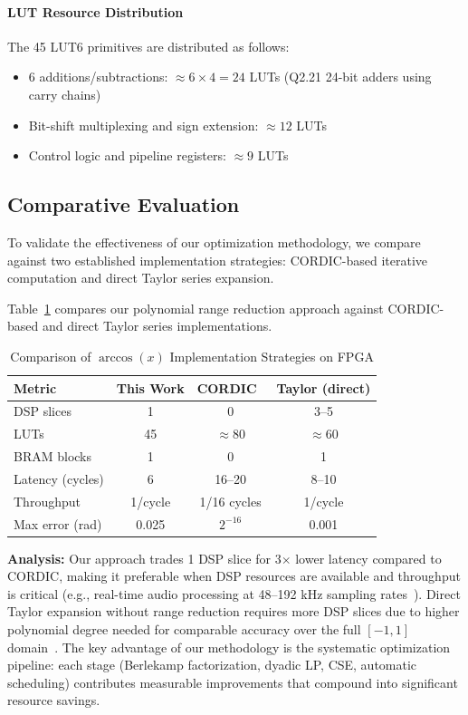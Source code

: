 \paragraph{LUT Resource Distribution}
The 45 LUT6 primitives are distributed as follows:
\begin{itemize}
    \item 6 additions/subtractions: $\approx 6 \times 4 = 24$ LUTs (Q2.21 24-bit adders using carry chains)
    \item Bit-shift multiplexing and sign extension: $\approx 12$ LUTs
    \item Control logic and pipeline registers: $\approx 9$ LUTs
\end{itemize}

\subsection{Comparative Evaluation}

To validate the effectiveness of our optimization methodology, we compare against two established implementation strategies: CORDIC-based iterative computation and direct Taylor series expansion.

Table~\ref{tab:arccos_comparison} compares our polynomial range reduction approach against CORDIC-based and direct Taylor series implementations.

\begin{table}[htbp]
\centering
\caption{Comparison of $\arccos(x)$ Implementation Strategies on FPGA}
\label{tab:arccos_comparison}
\begin{tabular}{lccc}
\hline
\textbf{Metric} & \textbf{This Work} & \textbf{CORDIC}~\cite{Volder1959,Andraka1998} & \textbf{Taylor (direct)} \\
\hline
DSP slices & 1 & 0 & 3–5 \\
LUTs & 45 & $\approx 80$ & $\approx 60$ \\
BRAM blocks & 1 & 0 & 1 \\
Latency (cycles) & 6 & 16–20 & 8–10 \\
Throughput & 1/cycle & 1/16 cycles & 1/cycle \\
Max error (rad) & 0.025 & $2^{-16}$ & 0.001 \\
\hline
\end{tabular}
\end{table}

\noindent\textbf{Analysis:} Our approach trades 1 DSP slice for 3$\times$ lower latency compared to CORDIC, making it preferable when DSP resources are available and throughput is critical (e.g., real-time audio processing at 48–192 kHz sampling rates~\cite{Syfala2024}). Direct Taylor expansion without range reduction requires more DSP slices due to higher polynomial degree needed for comparable accuracy over the full $[-1,1]$ domain~\cite{Muller2006}. The key advantage of our methodology is the systematic optimization pipeline: each stage (Berlekamp factorization, dyadic LP, CSE, automatic scheduling) contributes measurable improvements that compound into significant resource savings.

